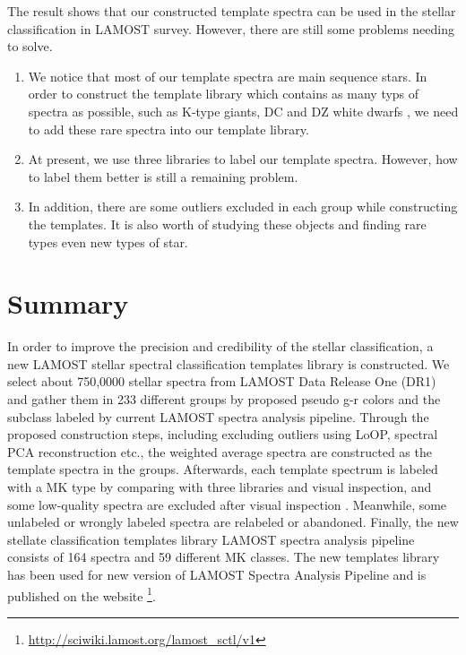 \documentclass[manuscript]{aastex}
\begin{document}
The result shows that our constructed template spectra can be used in the stellar classification in LAMOST survey.
However, there are still some problems needing to solve.
\begin{enumerate}
\item
We notice that most of our template spectra are main sequence stars.
In order to construct the template library which contains as many typs of spectra as possible,
such as  K-type giants, DC and DZ white dwarfs \citep{si2013search},
we need to add these rare spectra into our template library.
\item
At present, we use  three libraries to label our template spectra.
However, how to label them better is still a remaining problem.

\item
In addition, there are some outliers excluded in each group while constructing the templates.
It is also worth of studying these objects and finding rare types even new types of star.
\end{enumerate}



\section{Summary}
\label{sect:Summary}
In order to improve the precision  and credibility  of the stellar classification,
a new LAMOST stellar spectral classification templates library is constructed.
We select about 750,0000 stellar spectra from LAMOST Data Release One  (DR1) and gather them  in 233 different groups by proposed pseudo g-r colors and the subclass labeled by current LAMOST spectra analysis pipeline.
Through the proposed construction steps, including excluding outliers using LoOP, spectral PCA reconstruction etc.,
the weighted average spectra are constructed as the template spectra in the groups.
Afterwards, each template spectrum  is labeled with a MK type by comparing with three libraries and visual inspection,
and some low-quality spectra are excluded after visual inspection .
Meanwhile, some unlabeled or wrongly labeled spectra are relabeled  or abandoned.
Finally, the new stellate classification templates library LAMOST spectra analysis pipeline consists of 164 spectra and 59 different MK classes.
The new templates library has been used for new version of LAMOST Spectra Analysis Pipeline and is published on the website \footnote{\url{http://sciwiki.lamost.org/lamost_sctl/v1}}.
\end{document}
